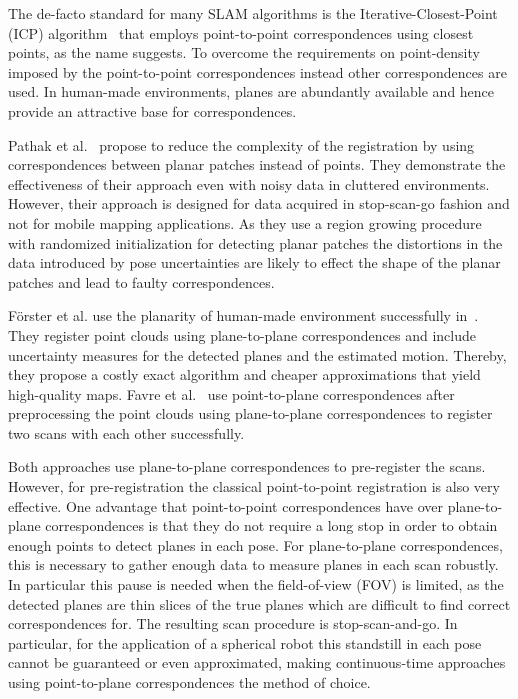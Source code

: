 \documentclass[5p]{elsarticle}
\begin{document}
The de-facto standard for many SLAM algorithms is the Iterative-Closest-Point (ICP) algorithm~\cite{Besl1992} that employs point-to-point correspondences using closest points, as the name suggests. 
To overcome the requirements on point-density imposed by the point-to-point corres\-pon\-den\-ces instead other correspondences are used. 
In human-made environments, planes are abundantly available and hence provide an attractive base for correspondences.

Pathak et al.~\cite{Pathak:2010} propose to reduce the complexity of the registration by using correspondences between planar patches instead of points.
They demonstrate the effectiveness of their approach even with noisy data in cluttered environments.
However, their approach is designed for data acquired in stop-scan-go fashion and not for mobile mapping applications.
As they use a region growing procedure with randomized initialization for detecting planar patches the distortions in the data introduced by pose uncertainties are likely to effect the shape of the planar patches and lead to faulty correspondences.

Förster et al. use the planarity of human-made environment successfully in~\cite{Foerstner2017}.
They register point clouds using plane-to-plane correspondences and include uncertainty measures for the detected planes and the estimated motion.
Thereby, they propose a costly exact algorithm and cheaper approximations that yield high-quality maps.
Favre et al.~\cite{favre2021} use point-to-plane correspondences after preprocessing the point clouds using plane-to-plane correspondences to register two scans with each other successfully.

Both approaches use plane-to-plane correspondences to pre-register the scans.
However, for pre-registration the classical point-to-point registration is also very effective. 
One advantage that point-to-point correspondences have over plane-to-plane correspondences is that they do not require a long stop in order to obtain enough points to detect planes in each pose.
For plane-to-plane correspondences, this is necessary to gather enough data to measure planes in each scan robustly. 
In particular this pause is needed when the field-of-view (FOV) is limited, as the detected planes are thin slices of the true planes which are difficult to find correct correspondences for. 
The resulting scan procedure is stop-scan-and-go.
In particular, for the application of a spherical robot this standstill in each pose cannot be guaranteed or even approximated, making continuous-time approaches using point-to-plane correspondences the method of choice.
\end{document}
